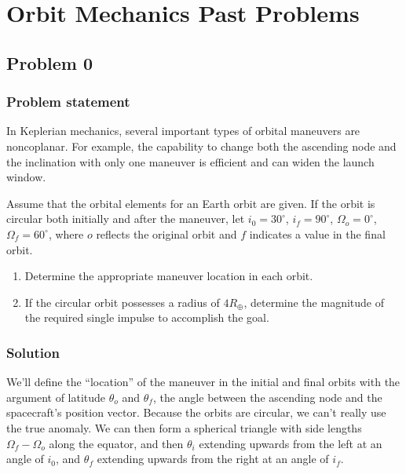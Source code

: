 \newcommand{\v}[1]{\mathbf{#1}}
\newcommand{\dv}[1]{\dot{\v{#1}}}
\newcommand{\ddv}[1]{\ddot{\v{#1}}}
\newcommand{\uv}[1]{\hat{\v{#1}}}



\maketitle

\section{Orbit Mechanics Past Problems}

\subsection{Problem 0}

\subsubsection{Problem statement}

In Keplerian mechanics, several important types of orbital maneuvers are noncoplanar. For example, the capability to change both the ascending node and the inclination with only one maneuver is efficient and can widen the launch window.

Assume that the orbital elements for an Earth orbit are given. If the orbit is circular both initially and after the maneuver, let $i_0=30^\circ$, $i_f=90^\circ$, $\Omega_o=0^\circ$, $\Omega_f=60^\circ$, where $o$ reflects the original orbit and $f$ indicates a value in the final orbit.

\begin{enumerate}
    \item Determine the appropriate maneuver location in each orbit.
    \item If the circular orbit possesses a radius of $4R_\oplus$, determine the magnitude of the required single impulse to accomplish the goal.
\end{enumerate}

\subsubsection{Solution}

We'll define the ``location'' of the maneuver in the initial and final orbits with the argument of latitude $\theta_o$ and $\theta_f$, the angle between the ascending node and the spacecraft's position vector. Because the orbits are circular, we can't really use the true anomaly. We can then form a spherical triangle with side lengths $\Omega_f - \Omega_o$ along the equator, and then $\theta_i$ extending upwards from the left at an angle of $i_0$, and $\theta_f$ extending upwards from the right at an angle of $i_f$.

